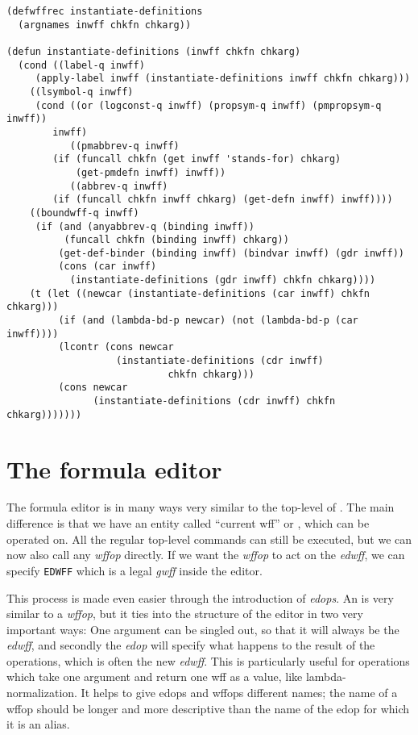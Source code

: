 \begin{verbatim}
(defwffrec instantiate-definitions
  (argnames inwff chkfn chkarg))

(defun instantiate-definitions (inwff chkfn chkarg)
  (cond ((label-q inwff)
	 (apply-label inwff (instantiate-definitions inwff chkfn chkarg)))
	((lsymbol-q inwff)
	 (cond ((or (logconst-q inwff) (propsym-q inwff) (pmpropsym-q inwff))
		inwff)
	       ((pmabbrev-q inwff)
		(if (funcall chkfn (get inwff 'stands-for) chkarg)
		    (get-pmdefn inwff) inwff))
	       ((abbrev-q inwff)
		(if (funcall chkfn inwff chkarg) (get-defn inwff) inwff))))
	((boundwff-q inwff)
	 (if (and (anyabbrev-q (binding inwff))
		  (funcall chkfn (binding inwff) chkarg))
	     (get-def-binder (binding inwff) (bindvar inwff) (gdr inwff))
	     (cons (car inwff)
		   (instantiate-definitions (gdr inwff) chkfn chkarg))))
	(t (let ((newcar (instantiate-definitions (car inwff) chkfn chkarg)))
	     (if (and (lambda-bd-p newcar) (not (lambda-bd-p (car inwff))))
		 (lcontr (cons newcar
			       (instantiate-definitions (cdr inwff)
							chkfn chkarg)))
		 (cons newcar
		       (instantiate-definitions (cdr inwff) chkfn chkarg)))))))

\end{verbatim}

\section{The formula editor}\label{EDOPS}

The formula editor is in many ways very similar to the top-level of
\tps.  The main difference is that we have an entity called 
``current wff'' or , which can be operated on.
All the regular top-level commands can still be executed, but we
can now also call any {\it wffop} directly.  If we want the {\it wffop} to
act on the {\it edwff}, we can specify {\tt EDWFF} which is a legal
{\it gwff} inside the editor.  

This process is made even easier through the introduction of {\it edops}.
An  is very similar to a {\it wffop}, but it ties into the
structure of the editor in two very important ways:  One argument can be
singled out, so that it will always be the {\it edwff}, and secondly the
{\it edop} will specify what happens to the result of the operations, which
is often the new {\it edwff}.  This is particularly useful for operations
which take one argument and return one wff as a value, like
lambda-normalization. It helps to give edops and wffops different names;
the name of a wffop should be longer and more descriptive than the name of
the edop for which it is an alias.

